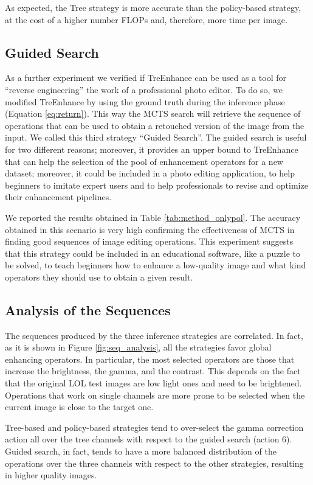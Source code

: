 \documentclass[3p,twocolumn]{elsarticle}
\newcommand{\method}[0]{TreEnhance}
\begin{document}
As expected, the Tree strategy is more accurate than the policy-based strategy, at the cost of a higher number FLOPs and, therefore, more time per image.

\subsection{Guided Search}

As a further experiment we verified if \method{} can be used as a tool for ``reverse engineering'' the work of a professional photo editor. To do so, we modified \method{} by using the ground truth during the inference phase (Equation \ref{eq:return}). This way the MCTS search will retrieve the sequence of operations that can be used to obtain a retouched version of the image from the input. We called this third strategy ``Guided Search''. The guided search is useful for two different reasons; moreover, it provides an upper bound to \method{} that can help the selection of the pool of enhancement operators for a new dataset; moreover, it could be included in a photo editing application, to help beginners to imitate expert users and to help professionals to revise and optimize their enhancement pipelines.

We reported the results obtained in Table \ref{tab:method_onlypol}.
The accuracy obtained in this scenario is very high confirming the effectiveness of MCTS in finding good sequences of image editing operations. This experiment suggests that this strategy could be included in an educational software, like a puzzle to be solved, to teach beginners how to enhance a low-quality image and what kind operators they should use to obtain a given result.



\subsection{Analysis of the Sequences}
The sequences produced by the three inference strategies are  correlated. In fact, as it is shown in Figure \ref{fig:seq_analysis}, all the strategies favor global enhancing operators. In particular, the most selected operators are those that increase the brightness, the gamma, and the contrast. This depends on the fact that the original LOL test images are low light ones and need to be brightened.  Operations that work on single channels are more prone to be selected when the current image is close to the target one.

Tree-based and policy-based strategies tend to over-select the gamma correction action all over the tree channels with respect to the guided search (action 6). Guided search, in fact, tends to have a more balanced distribution of the operations over the three channels with respect to the other strategies, resulting in higher quality images.
\end{document}
